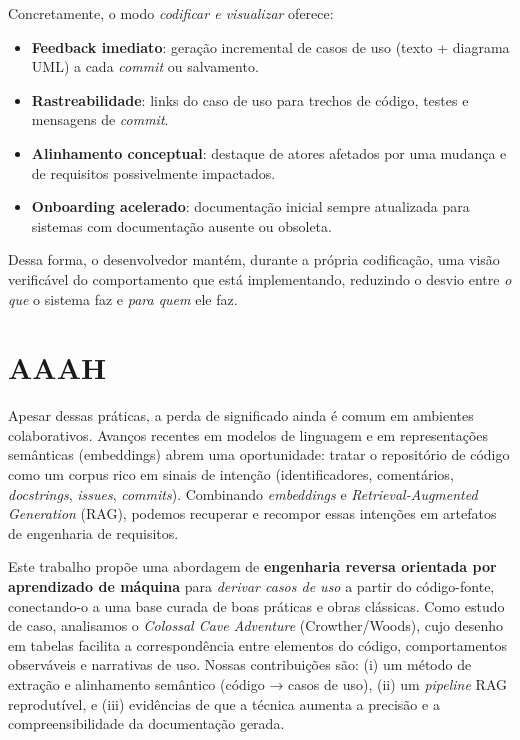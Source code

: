\documentclass[12pt,a4paper]{article}
\begin{document}
Concretamente, o modo \emph{codificar e visualizar} oferece:
\begin{itemize}
  \item \textbf{Feedback imediato}: geração incremental de casos de uso (texto + diagrama UML) a cada \emph{commit} ou salvamento.
  \item \textbf{Rastreabilidade}: links do caso de uso para trechos de código, testes e mensagens de \emph{commit}.
  \item \textbf{Alinhamento conceptual}: destaque de atores afetados por uma mudança e de requisitos possivelmente impactados.
  \item \textbf{Onboarding acelerado}: documentação inicial sempre atualizada para sistemas com documentação ausente ou obsoleta.
\end{itemize}

Dessa forma, o desenvolvedor mantém, durante a própria codificação, uma visão verificável do comportamento que está implementando, reduzindo o desvio entre \emph{o que} o sistema faz e \emph{para quem} ele faz.

\section{AAAH}

Apesar dessas práticas, a perda de significado ainda é comum em ambientes colaborativos. Avanços recentes em modelos de linguagem e em representações semânticas (embeddings) abrem uma oportunidade: tratar o repositório de código como um corpus rico em sinais de intenção (identificadores, comentários, \emph{docstrings}, \emph{issues}, \emph{commits}). Combinando \emph{embeddings} e \emph{Retrieval-Augmented Generation} (RAG), podemos recuperar e recompor essas intenções em artefatos de engenharia de requisitos.

Este trabalho propõe uma abordagem de \textbf{engenharia reversa orientada por aprendizado de máquina} para \emph{derivar casos de uso} a partir do código-fonte, conectando-o a uma base curada de boas práticas e obras clássicas. Como estudo de caso, analisamos o \emph{Colossal Cave Adventure} (Crowther/Woods), cujo desenho em tabelas facilita a correspondência entre elementos do código, comportamentos observáveis e narrativas de uso. Nossas contribuições são: (i) um método de extração e alinhamento semântico (código → casos de uso), (ii) um \emph{pipeline} RAG reprodutível, e (iii) evidências de que a técnica aumenta a precisão e a compreensibilidade da documentação gerada.
\end{document}
